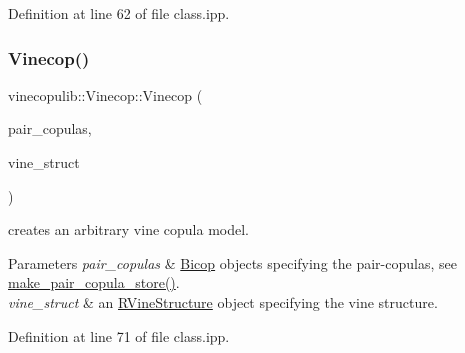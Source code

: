 Definition at line 62 of file class.\+ipp.

\mbox{\label{classvinecopulib_1_1_vinecop_a6f41f3f14cd479a62bef7448c00376d0}} 
\subsubsection{\texorpdfstring{Vinecop()}{Vinecop()}\hspace{0.1cm}{\footnotesize\ttfamily [5/13]}}
{\footnotesize\ttfamily vinecopulib\+::\+Vinecop\+::\+Vinecop (\begin{DoxyParamCaption}\item[{const std\+::vector$<$ std\+::vector$<$ \hyperlink{classvinecopulib_1_1_bicop}{Bicop} $>$$>$ \&}]{pair\+\_\+copulas,  }\item[{const \hyperlink{classvinecopulib_1_1_r_vine_structure}{R\+Vine\+Structure} \&}]{vine\+\_\+struct }\end{DoxyParamCaption})\hspace{0.3cm}{\ttfamily [inline]}}



creates an arbitrary vine copula model. 


\begin{DoxyParams}{Parameters}
{\em pair\+\_\+copulas} & \hyperlink{classvinecopulib_1_1_bicop}{Bicop} objects specifying the pair-\/copulas, see \hyperlink{classvinecopulib_1_1_vinecop_ac99ec5154d923ee5eb73fdad071bca46}{make\+\_\+pair\+\_\+copula\+\_\+store()}. \\
\hline
{\em vine\+\_\+struct} & an \hyperlink{classvinecopulib_1_1_r_vine_structure}{R\+Vine\+Structure} object specifying the vine structure. \\
\hline
\end{DoxyParams}


Definition at line 71 of file class.\+ipp.

\mbox{\label{classvinecopulib_1_1_vinecop_abc94737980ef5dbdc16b7d0aa66e683d}} 
